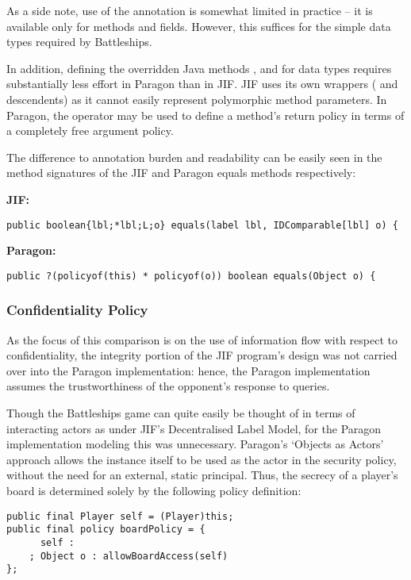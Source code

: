 As a side note, use of the  annotation is somewhat limited in practice -- it is available only for methods and  fields. However, this suffices for the simple data types required by Battleships.

In addition, defining the overridden Java methods ,  and  for data types requires substantially less effort in Paragon than in JIF. JIF uses its own wrappers ( and descendents) as it cannot easily represent polymorphic method parameters. In Paragon, the  operator may be used to define a method's return policy in terms of a completely free argument policy.

The difference to annotation burden and readability can be easily seen in the method signatures of the JIF and Paragon equals methods respectively:

\textbf{JIF:}

\begin{verbatim}
public boolean{lbl;*lbl;L;o} equals(label lbl, IDComparable[lbl] o) {
\end{verbatim}

\textbf{Paragon:}

\begin{verbatim}
public ?(policyof(this) * policyof(o)) boolean equals(Object o) {
\end{verbatim}

\subsubsection{Confidentiality Policy}

As the focus of this comparison is on the use of information flow with respect to confidentiality, the integrity portion of the JIF program's design was not carried over into the Paragon implementation: hence, the Paragon implementation assumes the trustworthiness of the opponent's response to queries.

Though the Battleships game can quite easily be thought of in terms of interacting actors as under JIF's Decentralised Label Model, for the Paragon implementation modeling this was unnecessary. Paragon's `Objects as Actors' approach allows the  instance itself to be used as the actor in the security policy, without the need for an external, static principal. Thus, the secrecy of a player's board is determined solely by the following policy definition:

\begin{verbatim}
public final Player self = (Player)this;
public final policy boardPolicy = {
	  self :
	; Object o : allowBoardAccess(self)
};
\end{verbatim}


